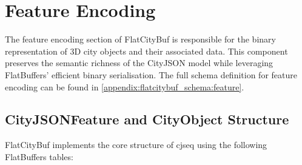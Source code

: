 
\section{Feature Encoding}
\label{methodology:feature_encoding}

The feature encoding section of FlatCityBuf is responsible for the binary representation of 3D city objects and their associated data. This component preserves the semantic richness of the CityJSON model while leveraging FlatBuffers' efficient binary serialisation. The full schema definition for feature encoding can be found in \autoref{appendix:flatcitybuf_schema:feature}.

\subsection{CityJSONFeature and CityObject Structure}
\label{methodology:feature_encoding:cityfeature_cityobject_structure}

FlatCityBuf implements the core structure of \ac{cjseq} using the following FlatBuffers tables:

